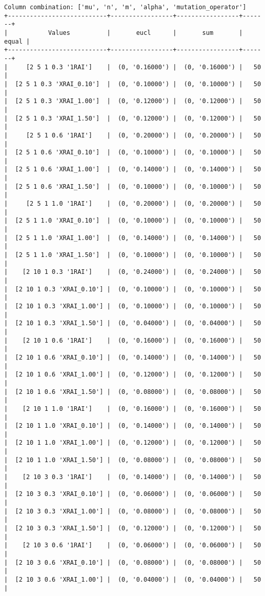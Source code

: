 \documentclass{article}
\begin{document}
\begin{verbatim}
Column combination: ['mu', 'n', 'm', 'alpha', 'mutation_operator']
+---------------------------+-----------------+-----------------+-------+
|           Values          |       eucl      |       sum       | equal |
+---------------------------+-----------------+-----------------+-------+
|     [2 5 1 0.3 '1RAI']    |  (0, '0.16000') |  (0, '0.16000') |   50  |
|  [2 5 1 0.3 'XRAI_0.10']  |  (0, '0.10000') |  (0, '0.10000') |   50  |
|  [2 5 1 0.3 'XRAI_1.00']  |  (0, '0.12000') |  (0, '0.12000') |   50  |
|  [2 5 1 0.3 'XRAI_1.50']  |  (0, '0.12000') |  (0, '0.12000') |   50  |
|     [2 5 1 0.6 '1RAI']    |  (0, '0.20000') |  (0, '0.20000') |   50  |
|  [2 5 1 0.6 'XRAI_0.10']  |  (0, '0.10000') |  (0, '0.10000') |   50  |
|  [2 5 1 0.6 'XRAI_1.00']  |  (0, '0.14000') |  (0, '0.14000') |   50  |
|  [2 5 1 0.6 'XRAI_1.50']  |  (0, '0.10000') |  (0, '0.10000') |   50  |
|     [2 5 1 1.0 '1RAI']    |  (0, '0.20000') |  (0, '0.20000') |   50  |
|  [2 5 1 1.0 'XRAI_0.10']  |  (0, '0.10000') |  (0, '0.10000') |   50  |
|  [2 5 1 1.0 'XRAI_1.00']  |  (0, '0.14000') |  (0, '0.14000') |   50  |
|  [2 5 1 1.0 'XRAI_1.50']  |  (0, '0.10000') |  (0, '0.10000') |   50  |
|    [2 10 1 0.3 '1RAI']    |  (0, '0.24000') |  (0, '0.24000') |   50  |
|  [2 10 1 0.3 'XRAI_0.10'] |  (0, '0.10000') |  (0, '0.10000') |   50  |
|  [2 10 1 0.3 'XRAI_1.00'] |  (0, '0.10000') |  (0, '0.10000') |   50  |
|  [2 10 1 0.3 'XRAI_1.50'] |  (0, '0.04000') |  (0, '0.04000') |   50  |
|    [2 10 1 0.6 '1RAI']    |  (0, '0.16000') |  (0, '0.16000') |   50  |
|  [2 10 1 0.6 'XRAI_0.10'] |  (0, '0.14000') |  (0, '0.14000') |   50  |
|  [2 10 1 0.6 'XRAI_1.00'] |  (0, '0.12000') |  (0, '0.12000') |   50  |
|  [2 10 1 0.6 'XRAI_1.50'] |  (0, '0.08000') |  (0, '0.08000') |   50  |
|    [2 10 1 1.0 '1RAI']    |  (0, '0.16000') |  (0, '0.16000') |   50  |
|  [2 10 1 1.0 'XRAI_0.10'] |  (0, '0.14000') |  (0, '0.14000') |   50  |
|  [2 10 1 1.0 'XRAI_1.00'] |  (0, '0.12000') |  (0, '0.12000') |   50  |
|  [2 10 1 1.0 'XRAI_1.50'] |  (0, '0.08000') |  (0, '0.08000') |   50  |
|    [2 10 3 0.3 '1RAI']    |  (0, '0.14000') |  (0, '0.14000') |   50  |
|  [2 10 3 0.3 'XRAI_0.10'] |  (0, '0.06000') |  (0, '0.06000') |   50  |
|  [2 10 3 0.3 'XRAI_1.00'] |  (0, '0.08000') |  (0, '0.08000') |   50  |
|  [2 10 3 0.3 'XRAI_1.50'] |  (0, '0.12000') |  (0, '0.12000') |   50  |
|    [2 10 3 0.6 '1RAI']    |  (0, '0.06000') |  (0, '0.06000') |   50  |
|  [2 10 3 0.6 'XRAI_0.10'] |  (0, '0.08000') |  (0, '0.08000') |   50  |
|  [2 10 3 0.6 'XRAI_1.00'] |  (0, '0.04000') |  (0, '0.04000') |   50  |

\end{verbatim}
\end{document}
